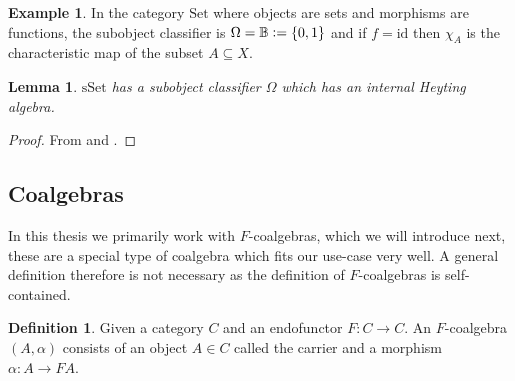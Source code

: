 \documentclass[12pt]{article}
\newtheorem{lemma}[theorem]{Lemma}
\theoremstyle{definition}
\newtheorem{definition}[theorem]{Definition}
\newtheorem{example}[theorem]{Example}
\newcommand{\defeq}{\vcentcolon=}
\newcommand{\1}{\mathbbm{1}}
\newcommand{\id}{\text{id}}
\begin{document}
\begin{example}
    In the category $\mathrm{Set}$ where objects are sets and morphisms are functions, the subobject classifier is $\Omega = \mathbb{B} \defeq \{0,1\}$ and if $f = \id$ then $\chi_A$ is the characteristic map of the subset $A\subseteq X$.
\end{example}

\begin{lemma}
    $\mathrm{sSet}$ has a subobject classifier $\Omega$ which has an internal Heyting algebra.
\end{lemma}

\begin{proof}
    From \cite[Lemma.~1.6.6]{Elephant} and \cite[Lemma.~1.6.3.ii]{Elephant}.
\end{proof}

\subsection{Coalgebras}
In this thesis we primarily work with $F$-coalgebras, which we will introduce next, these are a special type of coalgebra which fits our use-case very well. A general definition therefore is not necessary as the definition of $F$-coalgebras is self-contained.

\begin{definition}
    Given a category $C$ and an endofunctor $F: C \to C$. An $F$-coalgebra $(A,\alpha)$ consists of an object $A\in C$ called the carrier and a morphism $\alpha: A\to FA$.
\end{definition}
\end{document}
